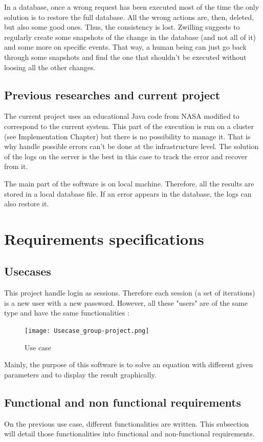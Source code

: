 \documentclass[10pt,a4paper]{report}
\begin{document}
In a database, once a wrong request has been executed most of the time the only solution is to restore the full database. All the wrong actions are, then, deleted, but also some good ones. Thus, the consistency is lost. Zwilling \cite{TecReview8} suggests to regularly create some snapshots of the change in the database (and not all of it) and some more on specific events. That way, a human being can just go back through some snapshots and find the one that shouldn't be executed without loosing all the other changes.	

\section{Previous researches and current project}
The current project uses an educational Java code from NASA \cite{WWW:NASA} modified to correspond to the current system. This part of the execution is run on a cluster (see Implementation Chapter) but there is no possibility to manage it. That is why handle possible errors can't be done at the infrastructure level. The solution of the logs on the server is the best in this case to track the error and recover from it. 

The main part of the software is on local machine. Therefore, all the results are stored in a local database file. If an error appears in the database, the logs can also restore it.



\chapter{Requirements specifications}
\label{ch:req}
\section{Usecases}
This project handle login as sessions. Therefore each session (a set of iterations) is a new user with a new password.  However, all these "users" are of the same type and have the same functionalities :

\begin{figure}[h!]
	\centering
\texttt{[image: Usecase\_group-project.png]}\\
\caption{Use case}
\end{figure}

Mainly, the purpose of this software is to solve an equation with different given parameters and to display the result graphically.

\section{Functional and non functional requirements}
On the previous use case, different functionalities are written. This subsection will detail those functionalities into functional and non-functional requirements.
\end{document}
